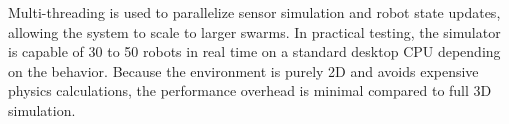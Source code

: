 Multi-threading is used to parallelize sensor simulation and robot state updates, allowing the system to scale to larger swarms. In practical testing, the simulator is capable of 30 to 50 robots in real time on a standard desktop CPU depending on the behavior. Because the environment is purely 2D and avoids expensive physics calculations, the performance overhead is minimal compared to full 3D simulation.

